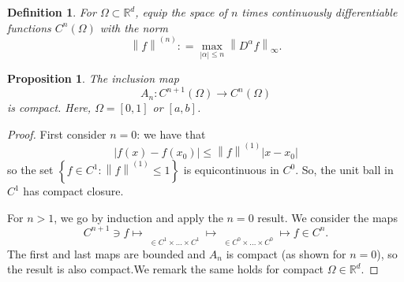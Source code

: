 \documentclass[letterpaper,twoside,11pt]{article}
\theoremstyle{mystyle}
\newtheorem{definition}{Definition}[section]
\newtheorem*{propp}{Proposition}
\newcommand{\R}{{\mathbb R}}
\begin{document}
\begin{definition}
  For $\Omega \subset \R^d$, equip the space of $n$ times continuously differentiable functions $C^n(\Omega)$ with the norm 
  \[{\left\| f \right\|^{\left( n \right)}}: = \mathop {\max }\limits_{\left| \alpha  \right| \leq n} {\left\| {{D^\alpha }f} \right\|_\infty }.\]
\end{definition}
\begin{propp}
  The inclusion map 
  \[A_n : C^{n+1} (\Omega) \to C^n(\Omega) \] is compact. Here, $\Omega = [0,1]$ or $[a,b]$. 
\end{propp}
\begin{proof}
  First consider $n=0$: we have that 
  \[\left| {f\left( x \right) - f\left( {{x_0}} \right)} \right| \leqslant {\left\| f \right\|^{\left( 1 \right)}}\left| {x - {x_0}} \right|\]
  so the set $\left\{ {f \in {C^1}:{{\left\| f \right\|}^{\left( 1 \right)}} \leqslant 1} \right\}$ is equicontinuous in $C^0$. So, the unit ball in $C^1$ has compact closure. 

  For $n>1$, we go by induction and apply the $n=0$ result. We consider the maps 
  \[{C^{n + 1}} \ni f \longmapsto \mathop {\left[ {\begin{array}{*{20}{c}}
    f \\ 
    {f'} \\ 
     \vdots  \\ 
    {{f^{\left( n \right)}}} 
  \end{array}} \right]}\limits_{ \in {C^1} \times  \ldots  \times {C^1}}  \longmapsto \mathop {\left[ {\begin{array}{*{20}{c}}
    {A_nf} \\ 
    {A_nf'} \\ 
     \vdots  \\ 
    {A_n{f^{\left( n \right)}}} 
  \end{array}} \right]}\limits_{ \in {C^0} \times  \ldots  \times {C^0}}  \longmapsto f \in {C^n}.\]
  The first and last maps are bounded and $A_n$ is compact (as shown for $n=0$), so the result is also compact.We remark the same holds for compact $\Omega \in \R^d$.  
\end{proof}
\end{document}
